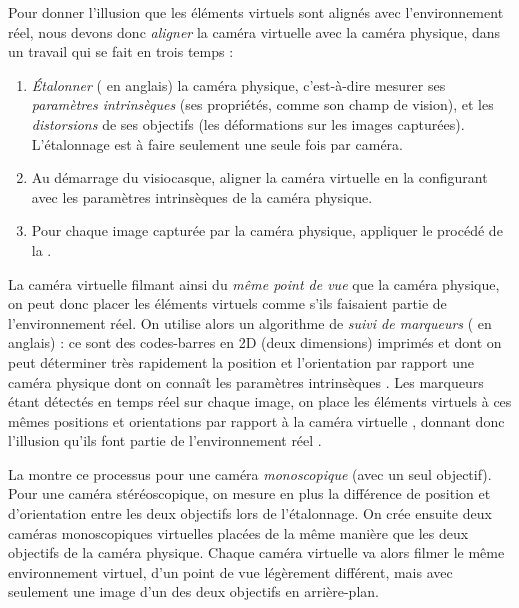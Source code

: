 Pour donner l'illusion que les éléments virtuels sont alignés avec l'environnement réel, nous devons donc \emph{aligner} la caméra virtuelle avec la caméra physique, dans un travail qui se fait en trois temps :
\begin{enumerate}
  \item \emph{Étalonner} ( en anglais) la caméra physique, c'est-à-dire mesurer ses \emph{paramètres intrinsèques} (ses propriétés, comme son champ de vision), et les \emph{distorsions} de ses objectifs (les déformations sur les images capturées). L'étalonnage est à faire seulement une seule fois par caméra.
  \item Au démarrage du visiocasque, aligner la caméra virtuelle en la configurant avec les paramètres intrinsèques de la caméra physique.
  \item Pour chaque image capturée par la caméra physique, appliquer le procédé de la .
\end{enumerate}
\bigskip

La caméra virtuelle filmant ainsi du \emph{même point de vue} que la caméra physique, on peut donc placer les éléments virtuels comme s'ils faisaient partie de l'environnement réel. On utilise alors un algorithme de \emph{suivi de marqueurs} ( en anglais) : ce sont des codes-barres en 2D (deux dimensions) imprimés  et dont on peut déterminer très rapidement la position et l'orientation par rapport une caméra physique dont on connaît les paramètres intrinsèques \cite{Garrido-Jurado2014}. Les marqueurs étant détectés en temps réel sur chaque image, on place les éléments virtuels à ces mêmes positions et orientations par rapport à la caméra virtuelle , donnant donc l'illusion qu'ils font partie de l'environnement réel .

La  montre ce processus pour une caméra \emph{monoscopique} (avec un seul objectif). Pour une caméra stéréoscopique, on mesure en plus la différence de position et d'orientation entre les deux objectifs lors de l'étalonnage. On crée ensuite deux caméras monoscopiques virtuelles placées de la même manière que les deux objectifs de la caméra physique. Chaque caméra virtuelle va alors filmer le même environnement virtuel, d'un point de vue légèrement différent, mais avec seulement une image d'un des deux objectifs en arrière-plan.

